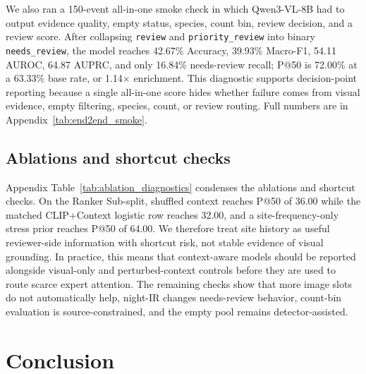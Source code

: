 \documentclass{article}
\begin{document}
We also ran a 150-event all-in-one smoke check in which Qwen3-VL-8B had to output evidence quality, empty status, species, count bin, review decision, and a review score. After collapsing \texttt{review} and \texttt{priority\_review} into binary \texttt{needs\_review}, the model reaches 42.67\% Accuracy, 39.93\% Macro-F1, 54.11 AUROC, 64.87 AUPRC, and only 16.84\% needs-review recall; P@50 is 72.00\% at a 63.33\% base rate, or 1.14$\times$ enrichment. This diagnostic supports decision-point reporting because a single all-in-one score hides whether failure comes from visual evidence, empty filtering, species, count, or review routing. Full numbers are in Appendix~\ref{tab:end2end_smoke}.

\subsection{Ablations and shortcut checks}

Appendix Table~\ref{tab:ablation_diagnostics} condenses the ablations and shortcut checks. On the Ranker Sub-split, shuffled context reaches P@50 of 36.00 while the matched CLIP+Context logistic row reaches 32.00, and a site-frequency-only stress prior reaches P@50 of 64.00. We therefore treat site history as useful reviewer-side information with shortcut risk, not stable evidence of visual grounding. In practice, this means that context-aware models should be reported alongside visual-only and perturbed-context controls before they are used to route scarce expert attention. The remaining checks show that more image slots do not automatically help, night-IR changes needs-review behavior, count-bin evaluation is source-constrained, and the empty pool remains detector-assisted.

\section{Conclusion}
\end{document}
